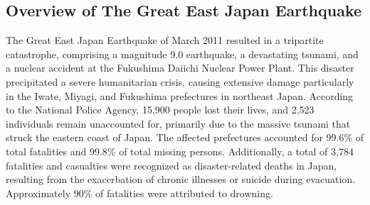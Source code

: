 \documentclass[a4paper,12pt]{article}
\begin{document}
\subsection{Overview of The Great East Japan Earthquake}

The Great East Japan Earthquake of March 2011 resulted in a tripartite catastrophe, comprising a magnitude 9.0 earthquake, a devastating tsunami, and a nuclear accident at the Fukushima Daiichi Nuclear Power Plant. This disaster precipitated a severe humanitarian crisis, causing extensive damage particularly in the Iwate, Miyagi, and Fukushima prefectures in northeast Japan. According to the National Police Agency, 15,900 people lost their lives, and 2,523 individuals remain unaccounted for, primarily due to the massive tsunami that struck the eastern coast of Japan. The affected prefectures accounted for 99.6\% of total fatalities and 99.8\% of total missing persons. Additionally, a total of 3,784 fatalities and casualties were recognized as disaster-related deaths in Japan, resulting from the exacerbation of chronic illnesses or suicide during evacuation. Approximately 90\% of fatalities were attributed to drowning.
\end{document}
